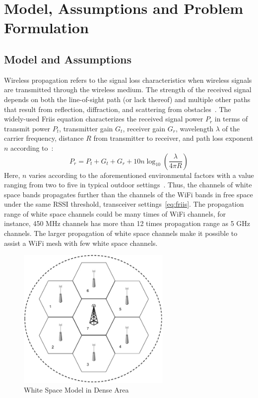 \section{Model, Assumptions and Problem Formulation}
\label{sec:problemformulation}

\subsection{Model and Assumptions}
\label{subsec:model}

Wireless propagation refers to the signal loss characteristics when wireless signals 
are transmitted through the wireless medium. The strength of the received signal depends on 
both the line-of-sight path (or lack thereof) and multiple other paths that result from reflection, 
diffraction, and scattering from obstacles~\cite{andersen1995propagation}. The widely-used Friis
equation characterizes the received signal power $P_r$ in terms of transmit power $P_t$, transmitter 
gain $G_t$, receiver gain $G_r$, wavelength $\lambda$ of the carrier frequency, distance $R$ from 
transmitter to receiver, and path loss exponent $n$ according to~\cite{friis}:
\begin{equation}
\label{eq:friis}
P_r=P_t+G_t+G_r+10n \log_{10}\left( \frac{\lambda}{4\pi R}\right)
\end{equation}
Here, $n$ varies according to the aforementioned environmental 
factors with a value ranging from two to five in typical outdoor 
settings~\cite{rappaport}.
Thus, the channels of white space bands propagates further than the channels of the WiFi bands in 
free space under the same RSSI threshold, transceiver settings~\ref{eq:friis}. 
The propagation range of white space channels could be many times of WiFi channels, for instance, 
450 MHz channels has more than 12 times propagation range as 5 GHz channels. The larger propagation 
of white space channels make it possible to assist a WiFi mesh with few white space channels. 


\begin{figure}
\vspace{-0.0in}
\centering
\includegraphics[width=74mm]{figures/whitecell}
\vspace{-0.1in}
\caption{White Space Model in Dense Area}
\label{fig:systemmodel}
\vspace{-0.1in}
\end{figure}



